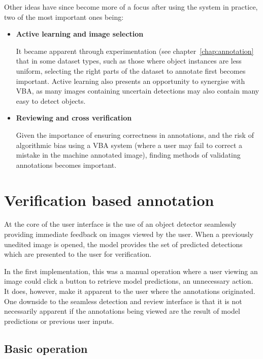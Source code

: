 Other ideas have since become more of a focus after using the system in practice, two of the most important ones being:

\begin{itemize}

\item {\bf Active learning and image selection} \par

It became apparent through experimentation (see chapter~\ref{chap:annotation} that in some dataset types, such as those where object instances are less uniform, selecting the right parts of the dataset to annotate first becomes important. Active learning also presents an opportunity to synergise with \gls{VBA}, as many images containing uncertain detections may also contain many easy to detect objects.

\item {\bf Reviewing and cross verification} \par

Given the importance of ensuring correctness in annotations, and the risk of algorithmic bias using a \gls{VBA} system (where a user may fail to correct a mistake in the machine annotated image), finding methods of validating annotations becomes important. 

\end{itemize}


\section {Verification based annotation}

At the core of the user interface is the use of an object detector seamlessly providing immediate feedback on images viewed by the user. When a previously unedited image is opened, the model provides the set of predicted detections which are presented to the user for verification. 

In the first implementation, this was a manual operation where a user viewing an image could click a button to retrieve model predictions, an unnecessary action. It does, however, make it apparent to the user where the annotations originated. One downside to the seamless detection and review interface is that it is not necessarily apparent if the annotations being viewed are the result of model predictions or previous user inputs.

\subsection{Basic operation}


